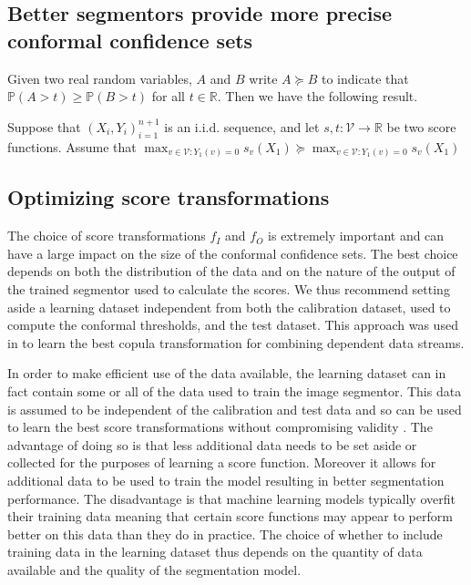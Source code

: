 \subsection{Better segmentors provide more precise conformal confidence sets}
Given two real random variables, $A$ and $B$ write $ A \succeq B$ to indicate that $\mathbb{P}\left( A > t \right) \geq \mathbb{P}\left( B > t \right)$ for all $t \in \mathbb{R}$. Then we have the following result. 
\begin{theorem}
	Suppose that $(X_i, Y_i)_{i = 1}^{n+1}$ is an i.i.d. sequence, and let $s, t: \mathcal{V} \rightarrow \mathbb{R}$ be two score functions. Assume that 
	$\max_{v \in \mathcal{V}: Y_1(v) = 0} s_v(X_{1}) \succeq \max_{v \in \mathcal{V}: Y_1(v) = 0} s_v(X_{1}) $
\end{theorem}

\subsection{Optimizing score transformations}
The choice of score transformations $f_I$ and $f_O$ is extremely important and can have a large impact on the size of the conformal confidence sets. The best choice depends on both the distribution of the data and on the nature of the output of the trained segmentor used to calculate the scores. We thus recommend setting aside a learning dataset independent from both the calibration dataset, used to compute the conformal thresholds, and the test dataset. This approach was used in \cite{Sun2024} to learn the best copula transformation for combining dependent data streams.

In order to make efficient use of the data available, the learning dataset can in fact contain some or all of the data used to train the image segmentor. This data is assumed to be independent of the calibration and test data and so can be used to learn the best score transformations without compromising validity . The advantage of doing so is that less additional data needs to be set aside or collected for the purposes of learning a score function. Moreover it allows for additional data to be used to train the model resulting in better segmentation performance. The disadvantage is that machine learning models typically overfit their training data meaning that certain score functions may appear to perform better on this data than they do in practice. The choice of whether to include training data in the learning dataset thus depends on the quantity of data available and the quality of the segmentation model.


